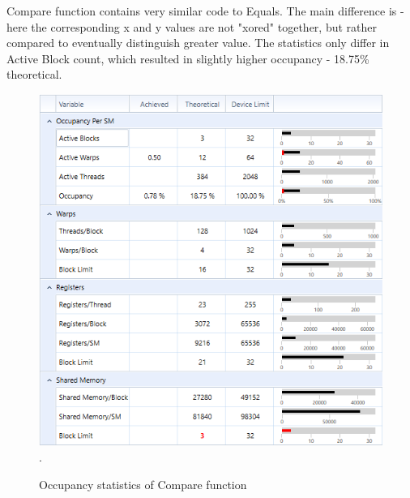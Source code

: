 \documentclass[oneside,openright,12pt,final,en]{mgr}
\begin{document}
Compare function contains very similar code to Equals. The main difference is - here the corresponding x and y values are not "xored" together, but rather compared to eventually distinguish greater value. The statistics only differ in Active Block count, which resulted in slightly higher occupancy - 18.75\% theoretical.  

\begin{figure}[H]
	\centering
	\includegraphics[width=\textwidth]{compare_occupancy}.
	\caption{Occupancy statistics of Compare function}
	\label{fig:compare_occupancy}
\end{figure}
\end{document}
